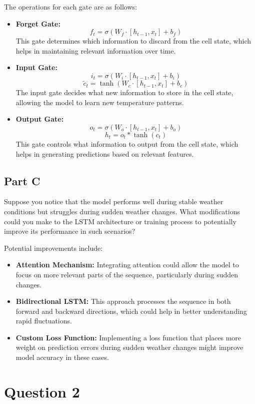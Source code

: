 \documentclass{exam}
\begin{document}
The operations for each gate are as follows:
\begin{itemize}
    \item \textbf{Forget Gate:}
    \[
    f_t = \sigma(W_f \cdot [h_{t-1}, x_t] + b_f)
    \]
    This gate determines which information to discard from the cell state, which helps in maintaining relevant information over time.

    \item \textbf{Input Gate:}
    \[
    i_t = \sigma(W_i \cdot [h_{t-1}, x_t] + b_i)
    \]
    \[
    \tilde{c}_t = \tanh(W_c \cdot [h_{t-1}, x_t] + b_c)
    \]
    The input gate decides what new information to store in the cell state, allowing the model to learn new temperature patterns.

    \item \textbf{Output Gate:}
    \[
    o_t = \sigma(W_o \cdot [h_{t-1}, x_t] + b_o)
    \]
    \[
    h_t = o_t * \tanh(c_t)
    \]
    This gate controls what information to output from the cell state, which helps in generating predictions based on relevant features.
\end{itemize}

\subsection*{\color{blue}Part C}
\noindent Suppose you notice that the model performs well during stable weather conditions but struggles during sudden weather changes. What modifications could you make to the LSTM architecture or training process to potentially improve its performance in such scenarios?

Potential improvements include:
\begin{itemize}
    \item \textbf{Attention Mechanism:} Integrating attention could allow the model to focus on more relevant parts of the sequence, particularly during sudden changes.
    \item \textbf{Bidirectional LSTM:} This approach processes the sequence in both forward and backward directions, which could help in better understanding rapid fluctuations.
    \item \textbf{Custom Loss Function:} Implementing a loss function that places more weight on prediction errors during sudden weather changes might improve model accuracy in these cases.
\end{itemize}

\section*{Question 2}
\end{document}
